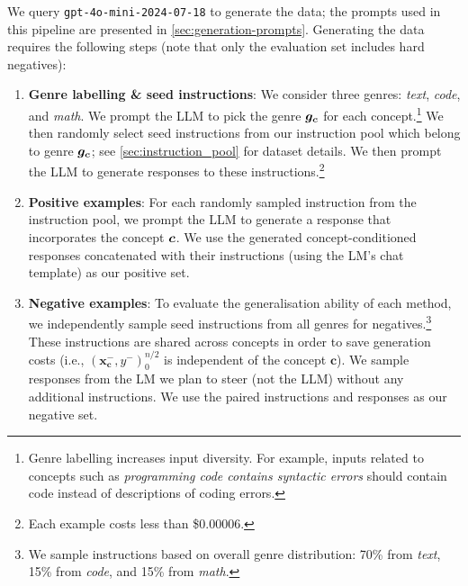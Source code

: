 \documentclass{article}
\theoremstyle{plain}
\theoremstyle{definition}
\theoremstyle{remark}
\begin{document}
We query \texttt{gpt-4o-mini-2024-07-18} to generate the data; the prompts used in this pipeline are presented in \cref{sec:generation-prompts}. Generating the data requires the following steps (note that only the evaluation set includes hard negatives):
\begin{enumerate}
    \item \textbf{Genre labelling \& seed instructions}: We consider three genres: \textit{text}, \textit{code}, and \textit{math}. We prompt the LLM to pick the genre ${\bm{g}}_{{\bm{c}}}$ for each concept.\footnote{Genre labelling increases input diversity. For example, inputs related to concepts such as \emph{programming code contains syntactic errors} should contain code instead of descriptions of coding errors.} We then randomly select seed instructions from our instruction pool which belong to genre ${\bm{g}}_{{\bm{c}}}$; see \cref{sec:instruction_pool} for dataset details. We then prompt the LLM to generate responses to these instructions.\footnote{Each example costs less than \$$0.00006$.}

    \item \textbf{Positive examples}: For each randomly sampled instruction from the instruction pool, we prompt the LLM to generate a response that incorporates the concept ${\bm{c}}$. We use the generated concept-conditioned responses concatenated with their instructions (using the LM's chat template) as our positive set.

    \item \textbf{Negative examples}: To evaluate the generalisation ability of each method, we independently sample seed instructions from all genres for negatives.\footnote{We sample instructions based on overall genre distribution: 70\% from \textit{text}, 15\% from \textit{code}, and 15\% from \textit{math}.} These instructions are shared across concepts in order to save generation costs (i.e., $(\mathbf{x}_{\mathbf{c}}^{-}, y^{-})_{0}^{n/2}$ is independent of the concept $\mathbf{c}$).
    We sample responses from the LM we plan to steer (not the LLM) without any additional instructions. We use the paired instructions and responses as our negative set.
    

\end{enumerate}
\end{document}
